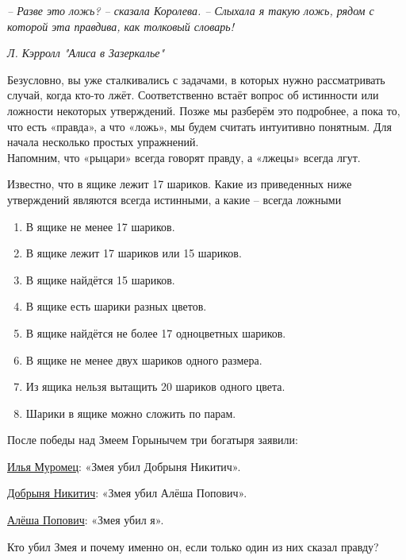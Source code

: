 
\epigraph{\textit{– Разве это ложь? – сказала Королева. – Слыхала я такую
ложь, рядом с которой эта правдива, как толковый словарь!}}{\textit{Л. Кэрролл "Алиса в Зазеркалье"}}

Безусловно, вы уже сталкивались с задачами, в которых нужно рассматривать случай, когда кто-то лжёт. Соответственно встаёт вопрос об истинности или ложности некоторых утверждений. Позже мы разберём это подробнее, а пока то, что есть «правда», а что «ложь», мы будем считать интуитивно понятным. Для начала несколько простых упражнений.
\\
Напомним, что «рыцари» всегда говорят правду, а «лжецы» всегда лгут.

\begin{ex}
    Известно, что в ящике лежит 17 шариков. Какие из приведенных ниже утверждений являются всегда истинными, а какие – всегда ложными
    \begin{enumerate}[label=\asbuk*), ref=\asbuk*]
        \item В ящике не менее 17 шариков.
        \item В ящике лежит 17 шариков или 15 шариков.
        \item В ящике найдётся 15 шариков.
        \item В ящике есть шарики разных цветов.
        \item В ящике найдётся не более 17 одноцветных шариков.
        \item В ящике не менее двух шариков одного размера.
        \item Из ящика нельзя вытащить 20 шариков одного цвета.
        \item Шарики в ящике можно сложить по парам.
    \end{enumerate}
\end{ex}

\begin{ex}
    После победы над Змеем Горынычем три богатыря заявили:
    \par
    \underline{Илья Муромец}: «Змея убил Добрыня Никитич».
    \par
    \underline{Добрыня Никитич}: «Змея убил Алёша Попович».
    \par
    \underline{Алёша Попович}: «Змея убил я».
    \par
    Кто убил Змея и почему именно он, если только один из них сказал правду?
\end{ex}

